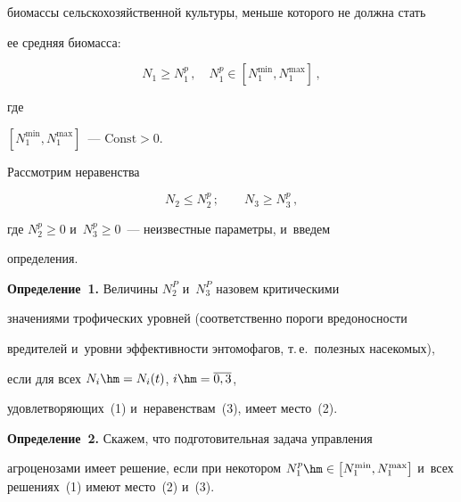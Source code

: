 биомассы сельскохозяйственной культуры, меньше которого не должна стать 


ее средняя биомасса:


\begin{equation}


N_1\geq N_1^p\,,\quad  N_1^p\in \left[ N_1^{\min}, N_1^{\max}\right]\,,


\label{e2-od}


\end{equation}


где  


$\left[ N_1^{\min}, N_1^{\max}\right]$~---  $\mathrm{Const}>0$.


Рассмотрим неравенства


\begin{equation}


N_2\leq N_2^p\,;\qquad N_3\geq N_3^p\,,


\label{e3-od}


\end{equation}


где $N_2^p\geq 0$ и~$N_3^p\geq 0$~--- неизвестные параметры, и~введем 


определения. 





\smallskip





\noindent


\textbf{Определение~1.} Величины $N_2^P$ и~$N_3^P$ назовем критическими 


значениями трофических уровней (соответственно пороги вредоносности 


вредителей и~уровни эффективности энтомофагов, т.\,е.\ полезных насекомых), 


если для всех $N_i\hm= N_i(t)$, $i\hm= \overline{0,3}$, 


удовлетворяющих~(1) и~неравенствам~(3), имеет место~(2).





\smallskip





\noindent


\textbf{Определение~2.} Скажем, что подготовительная задача управления 


агроценозами имеет решение, если при некотором  $N_1^p\hm\in \left[ 


N_1^{\min}, N_1^{\max}\right]$ и~всех решениях~(1) имеют место~(2) и~(3).





